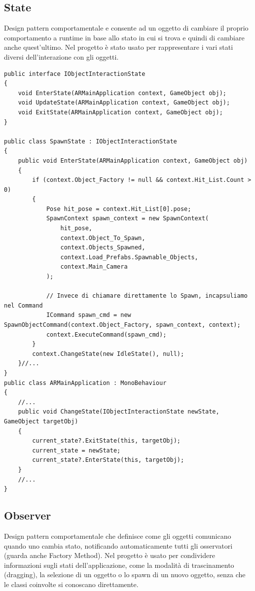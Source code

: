 \subsection{State}
Design pattern comportamentale e consente ad un oggetto di cambiare il proprio comportamento a runtime in base allo stato in cui si trova e quindi di cambiare anche quest'ultimo. Nel progetto è stato usato per rappresentare i vari stati diversi dell'interazione con gli oggetti.

\begin{lstlisting}[language={[Sharp]C}]
public interface IObjectInteractionState
{
    void EnterState(ARMainApplication context, GameObject obj);
    void UpdateState(ARMainApplication context, GameObject obj);
    void ExitState(ARMainApplication context, GameObject obj);
}

public class SpawnState : IObjectInteractionState
{
    public void EnterState(ARMainApplication context, GameObject obj)
    {
        if (context.Object_Factory != null && context.Hit_List.Count > 0)
        {
            Pose hit_pose = context.Hit_List[0].pose;
            SpawnContext spawn_context = new SpawnContext(
                hit_pose,
                context.Object_To_Spawn,
                context.Objects_Spawned,
                context.Load_Prefabs.Spawnable_Objects,
                context.Main_Camera
            );

            // Invece di chiamare direttamente lo Spawn, incapsuliamo nel Command
            ICommand spawn_cmd = new SpawnObjectCommand(context.Object_Factory, spawn_context, context);
            context.ExecuteCommand(spawn_cmd);
        }
        context.ChangeState(new IdleState(), null);
    }//...
}
public class ARMainApplication : MonoBehaviour
{
    //...
    public void ChangeState(IObjectInteractionState newState, GameObject targetObj)
    {
        current_state?.ExitState(this, targetObj);
        current_state = newState;
        current_state?.EnterState(this, targetObj);
    }
    //...
}
\end{lstlisting}

\subsection{Observer}
Design pattern comportamentale che definisce come gli oggetti comunicano quando uno cambia stato, notificando automaticamente tutti gli osservatori (guarda anche Factory Method). Nel progetto è usato per condividere informazioni sugli stati dell’applicazione, come la modalità di trascinamento (dragging), la selezione di un oggetto o lo spawn di un nuovo oggetto, senza che le classi coinvolte si conoscano direttamente.

